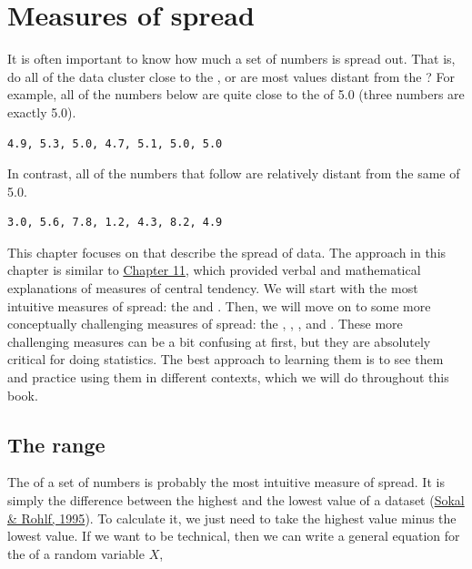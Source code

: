 \documentclass[
  openany]{krantz}
\begin{document}
\hypertarget{Chapter_12}{%
\chapter{Measures of spread}\label{Chapter_12}}

It is often important to know how much a set of numbers is spread out.
That is, do all of the data cluster close to the , or are most values distant from the ?
For example, all of the numbers below are quite close to the  of 5.0 (three numbers are exactly 5.0).

\begin{verbatim}
4.9, 5.3, 5.0, 4.7, 5.1, 5.0, 5.0
\end{verbatim}

In contrast, all of the numbers that follow are relatively distant from the same  of 5.0.

\begin{verbatim}
3.0, 5.6, 7.8, 1.2, 4.3, 8.2, 4.9
\end{verbatim}

This chapter focuses on  that describe the spread of data.
The approach in this chapter is similar to \protect\hyperlink{Chapter_11}{Chapter 11}, which provided verbal and mathematical explanations of measures of central tendency.
We will start with the most intuitive measures of spread: the  and .
Then, we will move on to some more conceptually challenging measures of spread: the , , , and .
These more challenging measures can be a bit confusing at first, but they are absolutely critical for doing statistics.
The best approach to learning them is to see them and practice using them in different contexts, which we will do throughout this book.

\hypertarget{the-range}{%
\section{The range}\label{the-range}}

The  of a set of numbers is probably the most intuitive measure of spread.
It is simply the difference between the highest and the lowest value of a dataset (\protect\hyperlink{ref-Sokal1995}{Sokal \& Rohlf, 1995}).
To calculate it, we just need to take the highest value minus the lowest value.
If we want to be technical, then we can write a general equation for the  of a random variable \(X\),
\end{document}
